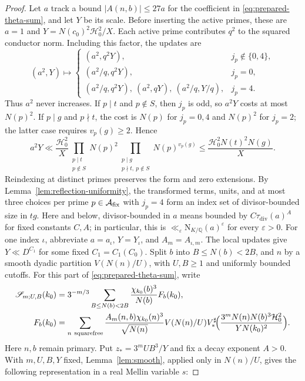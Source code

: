 \documentclass[11pt,a4paper]{article}
\numberwithin{equation}{section}
\numberwithin{figure}{section}
\theoremstyle{definition}
\theoremstyle{remark}
\newcommand{\Q}{\mathbb Q}
\newcommand{\NK}{\mathrm N_{K/\Q}}
\begin{document}
\begin{proof}
Let $a$ track a bound $|A(n,b)|\le27a$ for the coefficient in
\eqref{eq:prepared-theta-sum}, and let $Y$ be its scale.
Before inserting the active primes, these are $a=1$ and
$Y=N(c_0)^2\mathcal H_0^2/X$.
Each active prime contributes $q^2$ to the squared conductor norm.
Including this factor, the updates are
\[
 (a^2,Y)\longmapsto
 \begin{cases}
 (a^2,q^2Y),&j_p\notin\{0,4\},\\
 (a^2/q,q^2Y),&j_p=0,\\
 (a^2/q,q^2Y),\ (a^2,qY),\ (a^2/q,Y/q),&j_p=4.
 \end{cases}
\]
Thus $a^2$ never increases. If $p\mid t$ and $p\notin S$, then
$j_p$ is odd, so $a^2Y$ costs at most $N(p)^2$.
If $p\mid g$ and $p\nmid t$, the cost is
$N(p)$ for $j_p=0,4$ and $N(p)^2$ for $j_p=2$; the latter case
requires $v_p(g)\ge2$. Hence
\[
 a^2Y\ll\frac{\mathcal H_0^2}{X}
 \prod_{\substack{p\mid t\\p\notin S}}N(p)^2
 \prod_{\substack{p\mid g\\p\nmid t,\ p\notin S}}N(p)^{v_p(g)}
 \le\frac{\mathcal H_0^2N(t)^2N(g)}X.
\]
Reindexing at distinct primes preserves the form and zero extensions.
By %
Lemma~\ref{lem:reflection-uniformity}, the transformed terms, units,
and at most three choices per prime $p\in\mathcal A_{\rm fix}$ with $j_p=4$ form an index set
of divisor-bounded size in $tg$. Here and below, divisor-bounded in $a$ means bounded by $C\tau_{\mathrm{div}}(a)^A$ for fixed constants $C,A$; in particular, this is $\ll_\varepsilon\NK(a)^\varepsilon$ for every $\varepsilon>0$.
For one index $\iota$, abbreviate
$a=a_\iota$, $Y=Y_\iota$, and $A_m=A_{\iota,m}$.
The local updates give $Y\ll D^{C_1}$ for some fixed $C_1=C_1(C_0)$.
Split $b$ into $B\le N(b)<2B$, and $n$ by a smooth dyadic
partition $V(N(n)/U)$, with $U,B\ge1$ and uniformly bounded cutoffs.
For this part of \eqref{eq:prepared-theta-sum}, write
\[
 \begin{aligned}
 \mathscr S_{m;U,B}(k_0)
 &=3^{-m/3}\sum_{B\le N(b)<2B}\frac{\chi_{k_0}(b)^3}{N(b)}F_b(k_0),\\
 F_b(k_0)
 &=\sum_{n\ {\rm squarefree}}
 \frac{A_m(n,b)\chi_{k_0}(n)^3}{\sqrt{N(n)}}V(N(n)/U)
 V_*^\sharp\!\Bigl(\frac{3^mN(n)N(b)^3\mathcal H_0^2}
                         {YN(k_0)^2}\Bigr).
 \end{aligned}
\]
Here $n,b$ remain primary. Put $z_*=3^mUB^3/Y$ and fix a decay
exponent $A>0$. With $m,U,B,Y$ fixed, Lemma~\ref{lem:smooth},
applied only in $N(n)/U$, gives the following representation in a
real Mellin variable $s$:

\end{proof}
\end{document}

